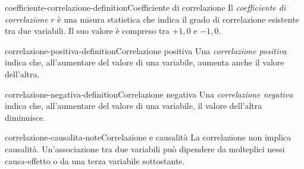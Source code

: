 \documentclass[preview]{standalone}
\begin{document}
\begin{snippetdefinition}{coefficiente-correlazione-definition}{Coefficiente di correlazione}
    Il \emph{coefficiente di correlazione} \(r\) è una misura statistica che
    indica il grado di correlazione esistente tra due variabili. Il suo valore
    è compreso tra \(+1{,}0\) e \(-1{,}0\).
\end{snippetdefinition}

\begin{snippetdefinition}{correlazione-positiva-definition}{Correlazione positiva}
    Una \emph{correlazione positiva} indica che, all'aumentare del valore di
    una variabile, aumenta anche il valore dell'altra.
\end{snippetdefinition}

\begin{snippetdefinition}{correlazione-negativa-definition}{Correlazione negativa}
    Una \emph{correlazione negativa} indica che, all'aumentare del valore di
    una variabile, il valore dell'altra diminuisce.
\end{snippetdefinition}

\begin{snippetnote}{correlazione-causalita-note}{Correlazione e causalità}
    La correlazione non implica causalità. Un'associazione tra due variabili
    può dipendere da molteplici nessi causa-effetto o da una terza variabile
    sottostante.
\end{snippetnote}
\end{document}
